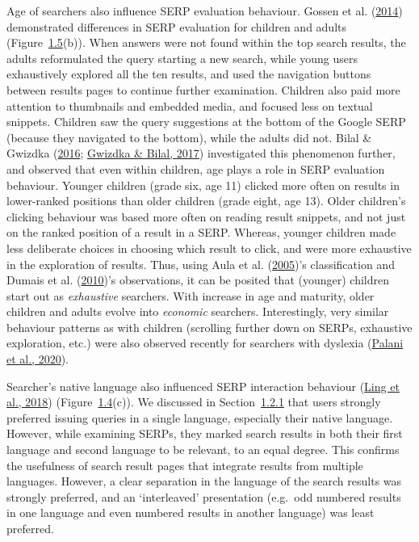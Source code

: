 \documentclass[a4paper, nobind]{templates/ociamthesis}
\begin{document}
Age of searchers also influence SERP evaluation behaviour. Gossen et al. (\protect\hyperlink{ref-124}{2014})
demonstrated differences in SERP evaluation for children and adults
(Figure~\protect\hyperlink{fig_res_L_serp_user_chars}{1.5}(b)). When answers were not found
within the top search results, the adults reformulated the query
starting a new search, while young users exhaustively explored all the
ten results, and used the navigation buttons between results pages to
continue further examination. Children also paid more attention to
thumbnails and embedded media, and focused less on textual snippets.
Children saw the query suggestions at the bottom of the Google SERP
(because they navigated to the bottom), while the adults did not. Bilal \& Gwizdka (\protect\hyperlink{ref-139}{2016}; \protect\hyperlink{ref-140}{Gwizdka \& Bilal, 2017}) investigated this phenomenon further, and observed that even
within children, age plays a role in SERP evaluation behaviour. Younger
children (grade six, age 11) clicked more often on results in
lower-ranked positions than older children (grade eight, age 13). Older
children's clicking behaviour was based more often on reading result
snippets, and not just on the ranked position of a result in a SERP.
Whereas, younger children made less deliberate choices in choosing which
result to click, and were more exhaustive in the exploration of results.
Thus, using Aula et al. (\protect\hyperlink{ref-102}{2005})'s classification and Dumais et al. (\protect\hyperlink{ref-117}{2010})'s observations, it can be
posited that (younger) children start out as \emph{exhaustive} searchers.
With increase in age and maturity, older children and adults evolve into
\emph{economic} searchers. Interestingly, very similar behaviour patterns as
with children (scrolling further down on SERPs, exhaustive exploration,
etc.) were also observed recently for searchers with dyslexia
(\protect\hyperlink{ref-palani2020eye}{Palani et al., 2020}).

Searcher's native language also influenced SERP interaction behaviour
(\protect\hyperlink{ref-132}{Ling et al., 2018}) (Figure~\protect\hyperlink{fig_int_L_serp}{1.4}(c)). We discussed in
Section~\protect\hyperlink{sec:bg_search_query}{1.2.1} that users strongly preferred issuing
queries in a single language, especially their native language. However,
while examining SERPs, they marked search results in both their first
language and second language to be relevant, to an equal degree. This
confirms the usefulness of search result pages that integrate results
from multiple languages. However, a clear separation in the language of
the search results was strongly preferred, and an `interleaved'
presentation (e.g.~odd numbered results in one language and even
numbered results in another language) was least preferred.
\end{document}

